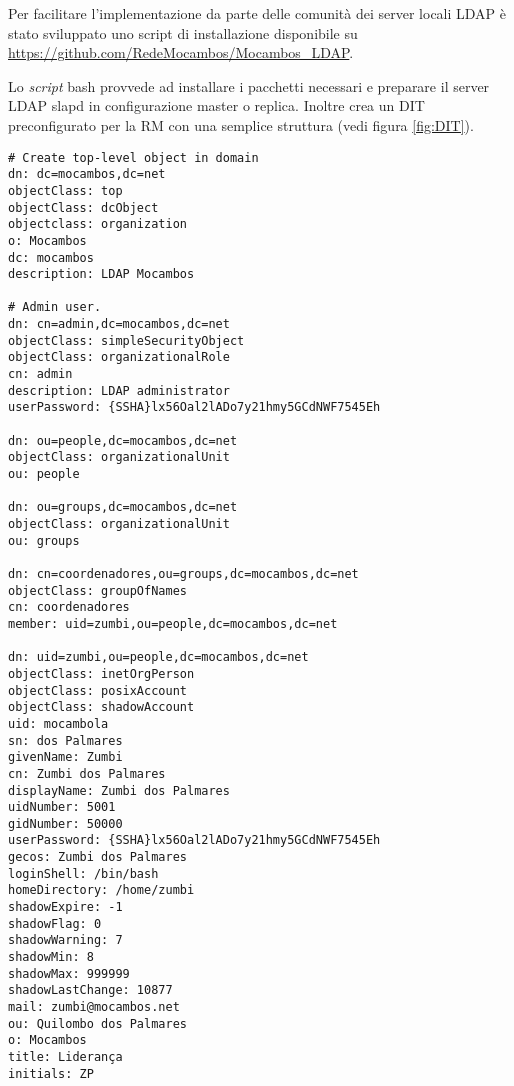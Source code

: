 Per facilitare l'implementazione da parte delle comunità dei server
locali LDAP è stato sviluppato uno script di installazione disponibile
su \url{https://github.com/RedeMocambos/Mocambos_LDAP}.

Lo \textit{script} bash provvede ad installare i pacchetti necessari e
preparare il server LDAP slapd in configurazione master o
replica. Inoltre crea un DIT preconfigurato per la RM con una semplice
struttura (vedi figura \ref{fig:DIT}).

\begin{verbatim}
# Create top-level object in domain
dn: dc=mocambos,dc=net
objectClass: top
objectClass: dcObject
objectclass: organization
o: Mocambos
dc: mocambos
description: LDAP Mocambos

# Admin user.
dn: cn=admin,dc=mocambos,dc=net
objectClass: simpleSecurityObject
objectClass: organizationalRole
cn: admin
description: LDAP administrator
userPassword: {SSHA}lx56Oal2lADo7y21hmy5GCdNWF7545Eh

dn: ou=people,dc=mocambos,dc=net
objectClass: organizationalUnit
ou: people

dn: ou=groups,dc=mocambos,dc=net
objectClass: organizationalUnit
ou: groups

dn: cn=coordenadores,ou=groups,dc=mocambos,dc=net
objectClass: groupOfNames
cn: coordenadores
member: uid=zumbi,ou=people,dc=mocambos,dc=net

dn: uid=zumbi,ou=people,dc=mocambos,dc=net
objectClass: inetOrgPerson
objectClass: posixAccount
objectClass: shadowAccount
uid: mocambola
sn: dos Palmares
givenName: Zumbi
cn: Zumbi dos Palmares
displayName: Zumbi dos Palmares
uidNumber: 5001
gidNumber: 50000
userPassword: {SSHA}lx56Oal2lADo7y21hmy5GCdNWF7545Eh
gecos: Zumbi dos Palmares
loginShell: /bin/bash
homeDirectory: /home/zumbi
shadowExpire: -1
shadowFlag: 0
shadowWarning: 7
shadowMin: 8
shadowMax: 999999
shadowLastChange: 10877
mail: zumbi@mocambos.net
ou: Quilombo dos Palmares
o: Mocambos
title: Liderança
initials: ZP

\end{verbatim}

